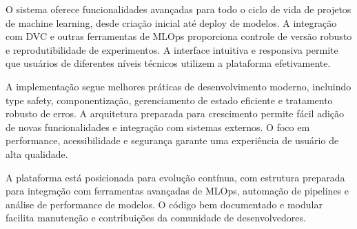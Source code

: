 \documentclass[12pt,a4paper]{article}
\begin{document}
O sistema oferece funcionalidades avançadas para todo o ciclo de vida de projetos de machine learning, desde criação inicial até deploy de modelos. A integração com DVC e outras ferramentas de MLOps proporciona controle de versão robusto e reprodutibilidade de experimentos. A interface intuitiva e responsiva permite que usuários de diferentes níveis técnicos utilizem a plataforma efetivamente.

A implementação segue melhores práticas de desenvolvimento moderno, incluindo type safety, componentização, gerenciamento de estado eficiente e tratamento robusto de erros. A arquitetura preparada para crescimento permite fácil adição de novas funcionalidades e integração com sistemas externos. O foco em performance, acessibilidade e segurança garante uma experiência de usuário de alta qualidade.

A plataforma está posicionada para evolução contínua, com estrutura preparada para integração com ferramentas avançadas de MLOps, automação de pipelines e análise de performance de modelos. O código bem documentado e modular facilita manutenção e contribuições da comunidade de desenvolvedores.
\end{document}
